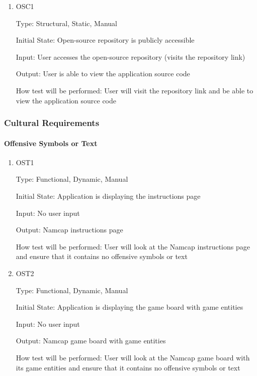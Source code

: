 \documentclass[12pt, titlepage]{article}
\begin{document}
\begin{enumerate}

\item{OSC1\\}

Type: Structural, Static, Manual
					
Initial State: Open-source repository is publicly accessible
					
Input: User accesses the open-source repository (visits the repository link)
					
Output: User is able to view the application source code
					
How test will be performed: User will visit the repository link and be able to view the application source code

\end{enumerate}

\subsubsection{Cultural Requirements}

\paragraph{Offensive Symbols or Text}

\begin{enumerate}

\item{OST1\\}

Type: Functional, Dynamic, Manual
					
Initial State: Application is displaying the instructions page
					
Input: No user input
					
Output: Namcap instructions page
					
How test will be performed: User will look at the Namcap instructions page and ensure that it contains no offensive symbols or text
					
\item{OST2\\}

Type: Functional, Dynamic, Manual
					
Initial State: Application is displaying the game board with game entities
					
Input: No user input
					
Output: Namcap game board with game entities
					
How test will be performed: User will look at the Namcap game board with its game entities and ensure that it contains no offensive symbols or text

\end{enumerate}
\end{document}
